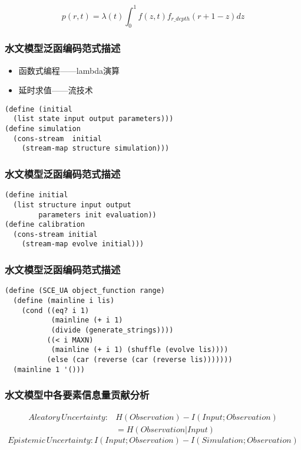 \documentclass{beamer}
\begin{document}
\begin{CJK}{UTF8}{gkai}
\begin{frame}
 \begin{equation}
 p(r,t)=\lambda(t)\int_{0}^{1} f(z,t)f_{r\_depth}(r+1-z)dz
 \end{equation} 
\end{frame}

\begin{frame}[fragile]
\frametitle{水文模型泛函编码范式描述}
\begin{itemize}
\item 函数式编程——lambda演算
\item 延时求值——流技术
\end{itemize}
\begin{lstlisting} 
(define (initial 
  (list state input output parameters)))
(define simulation 
  (cons-stream  initial  
    (stream-map structure simulation)))
\end{lstlisting}
\end{frame}

\begin{frame}[fragile]
\frametitle{水文模型泛函编码范式描述}

\begin{lstlisting} 
(define initial 
  (list structure input output 
        parameters init evaluation)) 
(define calibration 
  (cons-stream initial 
    (stream-map evolve initial)))
\end{lstlisting}
\end{frame}

\begin{frame}[fragile]
\frametitle{水文模型泛函编码范式描述}
\begin{lstlisting} 
(define (SCE_UA object_function range) 
  (define (mainline i lis)
    (cond ((eq? i 1) 
           (mainline (+ i 1) 
           (divide (generate_strings))))
          ((< i MAXN) 
           (mainline (+ i 1) (shuffle (evolve lis))))
          (else (car (reverse (car (reverse lis)))))))
  (mainline 1 '()))
\end{lstlisting}
\end{frame}


\begin{frame}
\frametitle{水文模型中各要素信息量贡献分析}
\begin{equation}
\begin{split}
Aleatory\,Uncertainty: &H(Observation)-I(Input;Observation)\\&= H(Observation|Input)
\end{split}
\end{equation}
\begin{equation}
Epistemic\,Uncertainty: I(Input;Observation)-I(Simulation;Observation)
\end{equation}
\end{frame}


\end{CJK}
\end{document}
